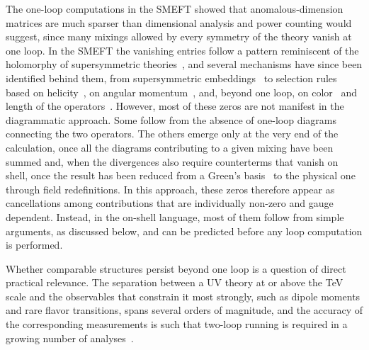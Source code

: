 The one-loop computations in the SMEFT showed that anomalous-dimension matrices are much sparser
than dimensional analysis and power counting would suggest, since many mixings allowed by every
symmetry of the theory vanish at one loop. In the SMEFT the vanishing entries follow a pattern
reminiscent of the holomorphy of supersymmetric theories~\cite{Alonso:2014rga}, and several
mechanisms have since been identified behind them, from supersymmetric embeddings~\cite{Elias-Miro:2014eia} to selection rules based on helicity~\cite{Cheung:2015aba}, on angular momentum~\cite{Jiang:2020rwz}, and,
beyond one loop, on color~\cite{Bern:2020ikv} and length of the operators~\cite{Bern:2019wie}. 
However, most of these zeros are not manifest in the diagrammatic approach. Some follow from the absence of one-loop diagrams connecting the two operators. The others emerge only at the very end of the calculation, once all the diagrams contributing to a given mixing have been summed and, when the divergences also require counterterms that vanish on shell, once the result has been reduced from a Green's basis~\cite{Gherardi:2020det} to the physical one through field redefinitions. In this approach, these zeros therefore appear as cancellations among contributions that are individually non-zero and gauge dependent.
Instead, in the on-shell language, most of them follow
from simple arguments, as discussed below, and can be predicted before any loop computation is
performed.

Whether comparable structures persist beyond one loop is a question of direct practical relevance.
The separation between a UV theory at or above the TeV scale and the observables that constrain it
most strongly, such as dipole moments and rare flavor transitions, spans several orders of
magnitude, and the accuracy of the corresponding measurements is such that two-loop running is
required in a growing number of
analyses~\cite{Allwicher:2023aql,Stefanek:2024kds,Haisch:2024wnw,Olgoso:2025jot,Mantani:2026fao,Born:2026tgm,Haisch:2026eyq}.

